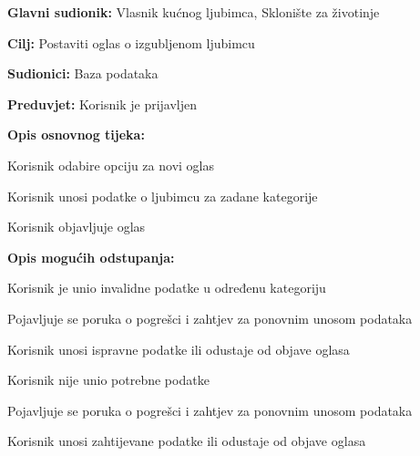 \noindent {}
\begin{packed_item}

	\item \textbf{Glavni sudionik: }Vlasnik kućnog ljubimca, Sklonište za životinje
	\item  \textbf{Cilj:} Postaviti oglas o izgubljenom ljubimcu
	\item  \textbf{Sudionici:} Baza podataka
	\item  \textbf{Preduvjet:} Korisnik je prijavljen
	\item  \textbf{Opis osnovnog tijeka:}

	\item[] \begin{packed_enum}

		\item Korisnik odabire opciju za novi oglas
		\item Korisnik unosi podatke o ljubimcu za zadane kategorije
		\item Korisnik objavljuje oglas
	\end{packed_enum}

	\item  \textbf{Opis mogućih odstupanja:}

	\item[] \begin{packed_item}

		\item[2.a] Korisnik je unio invalidne podatke u određenu kategoriju
		\item[] \begin{packed_enum}

			\item Pojavljuje se poruka o pogrešci i zahtjev za ponovnim unosom podataka
			\item Korisnik unosi ispravne podatke ili odustaje od objave oglasa

		\end{packed_enum}
		\item[2.b] Korisnik nije unio potrebne podatke
		\item[] \begin{packed_enum}

			\item Pojavljuje se poruka o pogrešci i zahtjev za ponovnim unosom podataka
			\item Korisnik unosi zahtijevane podatke ili odustaje od objave oglasa

		\end{packed_enum}
	\end{packed_item}
\end{packed_item}
